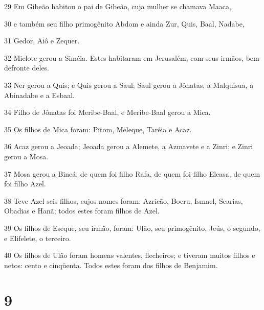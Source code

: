 \par 29 Em Gibeão habitou o pai de Gibeão, cuja mulher se chamava Maaca,
\par 30 e também seu filho primogênito Abdom e ainda Zur, Quis, Baal, Nadabe,
\par 31 Gedor, Aiô e Zequer.
\par 32 Miclote gerou a Siméia. Estes habitaram em Jerusalém, com seus irmãos, bem defronte deles.
\par 33 Ner gerou a Quis; e Quis gerou a Saul; Saul gerou a Jônatas, a Malquisua, a Abinadabe e a Esbaal.
\par 34 Filho de Jônatas foi Meribe-Baal, e Meribe-Baal gerou a Mica.
\par 35 Os filhos de Mica foram: Pitom, Meleque, Taréia e Acaz.
\par 36 Acaz gerou a Jeoada; Jeoada gerou a Alemete, a Azmavete e a Zinri; e Zinri gerou a Mosa.
\par 37 Mosa gerou a Bineá, de quem foi filho Rafa, de quem foi filho Eleasa, de quem foi filho Azel.
\par 38 Teve Azel seis filhos, cujos nomes foram: Azricão, Bocru, Ismael, Searias, Obadias e Hanã; todos estes foram filhos de Azel.
\par 39 Os filhos de Eseque, seu irmão, foram: Ulão, seu primogênito, Jeús, o segundo, e Elifelete, o terceiro.
\par 40 Os filhos de Ulão foram homens valentes, flecheiros; e tiveram muitos filhos e netos: cento e cinqüenta. Todos estes foram dos filhos de Benjamim.

\chapter{9}

